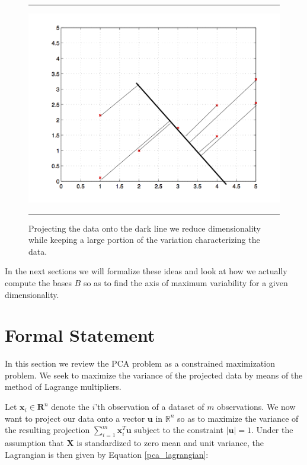 \documentclass[11pt, oneside, a4paper]{report}
\begin{document}
\begin{figure}
  \centering
  \hrule
  \includegraphics[width = .9\textwidth]{Figures/pca2.png}
  \hrule
  \caption{Projecting the data onto the dark line we reduce
    dimensionality while keeping a large portion of the variation
    characterizing the data.}
  \label{pca2}
\end{figure}

In the next sections we will formalize these ideas and look at how we
actually compute the bases $B$ so as to find the axis of maximum
variability for a given dimensionality. 

\section{Formal Statement}

In this section we review the PCA problem as a constrained
maximization problem. We seek to maximize the variance of the
projected data by means of the method of Lagrange multipliers. 


Let $\boldsymbol{x}_i \in \mathbf{R}^n$ denote the $i$'th observation of a dataset
of $m$ observations. We now want to project our data onto a vector $\boldsymbol{u}$
in $\mathbb{R}^n$ so as to maximize the variance of the resulting
projection $\sum_{i=1}^m \boldsymbol{x}_i^T \boldsymbol{u}$ subject to the constraint
$|\boldsymbol{u}|=1$. Under the assumption that $\boldsymbol{X}$ is
standardized to zero mean and unit variance, the Lagrangian is then
given by Equation \ref{pca_lagrangian}:
\end{document}
